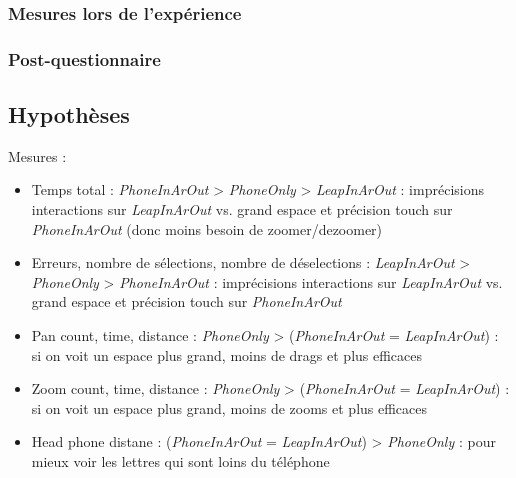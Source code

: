 \subsubsection{Mesures lors de l'expérience}

\subsubsection{Post-questionnaire}

\subsection{Hypothèses}
Mesures :
\begin{itemize}
  \item Temps total : \textit{PhoneInArOut} > \textit{PhoneOnly} > \textit{LeapInArOut} : imprécisions interactions sur \textit{LeapInArOut} vs. grand espace et précision touch sur \textit{PhoneInArOut} (donc moins besoin de zoomer/dezoomer)
  \item Erreurs, nombre de sélections, nombre de déselections : \textit{LeapInArOut} > \textit{PhoneOnly} > \textit{PhoneInArOut} : imprécisions interactions sur \textit{LeapInArOut} vs. grand espace et précision touch sur \textit{PhoneInArOut}
  \item Pan count, time, distance : \textit{PhoneOnly} > (\textit{PhoneInArOut} = \textit{LeapInArOut}) : si on voit un espace plus grand, moins de drags et plus efficaces
  \item Zoom count, time, distance : \textit{PhoneOnly} > (\textit{PhoneInArOut} = \textit{LeapInArOut}) : si on voit un espace plus grand, moins de zooms et plus efficaces
  \item Head phone distane : (\textit{PhoneInArOut} = \textit{LeapInArOut}) > \textit{PhoneOnly} : pour mieux voir les lettres qui sont loins du téléphone
\end{itemize}

